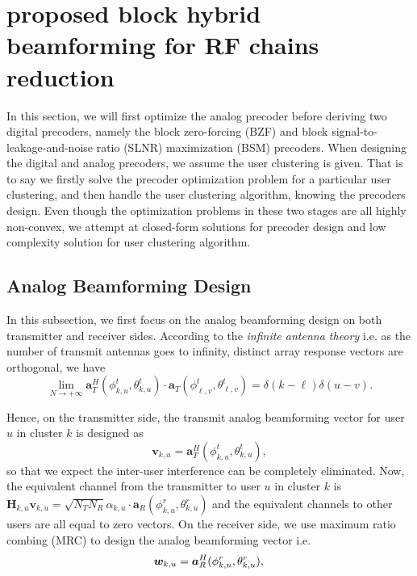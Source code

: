 \documentclass[conference]{IEEEtran}
\begin{document}
{\section{proposed block hybrid beamforming for RF chains reduction}
In this section, we will first optimize the analog precoder before deriving two digital precoders, namely the block zero-forcing (BZF) and block signal-to-leakage-and-noise ratio (SLNR) maximization (BSM) precoders. When designing the digital and analog precoders, we assume the user clustering is given. That is to say we firstly solve the precoder optimization problem for a particular user clustering, and then handle the user clustering algorithm, knowing the precoders design. Even though the optimization problems in these two stages are all highly non-convex, we attempt at closed-form solutions for precoder design and low complexity solution for user clustering algorithm.

\subsection{Analog Beamforming Design}
In this subsection, we first focus on the analog beamforming design on both transmitter and receiver sides. According to the \textit{infinite antenna theory} i.e. as the number of transmit antennas goes to infinity, distinct array response vectors are orthogonal, we have
\begin{equation}\label{Eq:assumption}
\lim_{N\rightarrow +\infty} \bm{a}_{T}^{H}(\phi^t_{k,u},\theta^t_{k,u}) \cdot\bm{a}_{T}(\phi^t_{\ell,v},\theta^t_{\ell,v})=\delta(k-\ell)\delta(u-v).
\end{equation}

Hence, on the transmitter side, the transmit analog beamforming vector for user $u$ in cluster $k$ is designed as
\begin{equation}
\bm{v}_{k,u}=\bm{a}_{T}^{H}(\phi^t_{k,u},\theta^t_{k,u}),
\label{eq:vku}
\end{equation}
so that we expect the inter-user interference can be completely eliminated. Now, the equivalent channel from the transmitter to user $u$ in cluster $k$ is $\bm{H}_{k,u}\bm{v}_{k,u}=\sqrt{N_{T}N_{R}}\alpha_{k,u}\cdot \bm{a}_{R}(\phi^r_{k,u},\theta^r_{k,u})$ and the equivalent channels to other users are all equal to zero vectors. On the receiver side, we use maximum ratio combing (MRC) to design the analog beamforming vector i.e.
\begin{equation}
\bm{w}_{k,u}=\bm{a}_{R}^{H}(\phi^r_{k,u},\theta^r_{k,u}),\\
\label{eq:wku}
\end{equation}

}
\end{document}
